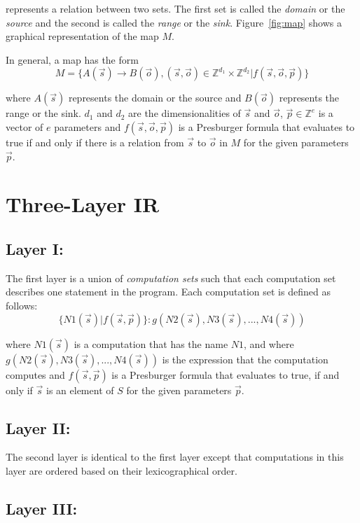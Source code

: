 \noindent represents a relation between two sets. The first set
is called the \emph{domain} or the \emph{source}
and the second is called the \emph{range} or the
\emph{sink}.
Figure~\ref{fig:map} shows a graphical representation of
the map $M$.


In general, a map has the form
$$M = \{A(\vec{s}) \rightarrow B(\vec{o}), (\vec{s}, \vec{o}) \in \mathbb{Z}^{d_1}\times\mathbb{Z}^{d_2} | f(\vec{s}, \vec{o}, \vec{p})\}$$

\noindent where $A(\vec{s})$ represents the domain or the
source and $B(\vec{o})$ represents the range or the sink.
$d_1$ and $d_2$ are the dimensionalities of $\vec{s}$
and $\vec{o}$, $\vec{p} \in \mathbb{Z}^e$ is a vector of $e$ parameters and $f(\vec{s}, \vec{o}, \vec{p})$ is a Presburger formula that evaluates to true if and only if there is a relation from $\vec{s}$ to $\vec{o}$ in $M$ for the given parameters
$\vec{p}$.

\section{Three-Layer IR}
\label{appendixlayers}
\subsection{Layer I: \Layerone}

The first layer is a union of \emph{computation sets} such that each computation set describes one statement in the program. Each computation set is defined as follows:
$$\{N1(\vec{s}) | f(\vec{s}, \vec{p})\} : g(N2(\vec{s}), N3(\vec{s}), ..., N4(\vec{s}))$$

\noindent where $N1(\vec{s})$ is a computation that has the name $N1$, and where $g(N2(\vec{s}), N3(\vec{s}), ..., N4(\vec{s}))$ is the expression that the computation computes and $f(\vec{s}, \vec{p})$ is a Presburger formula that evaluates to true, if and only if $\vec{s}$ is an element of $S$ for the given parameters $\vec{p}$.


\subsection{Layer II: \Layertwo}

The second layer is identical to the first layer except that computations in this layer are ordered based on their lexicographical order.

\subsection{Layer III: \Layerthree}
\label{layer3}

